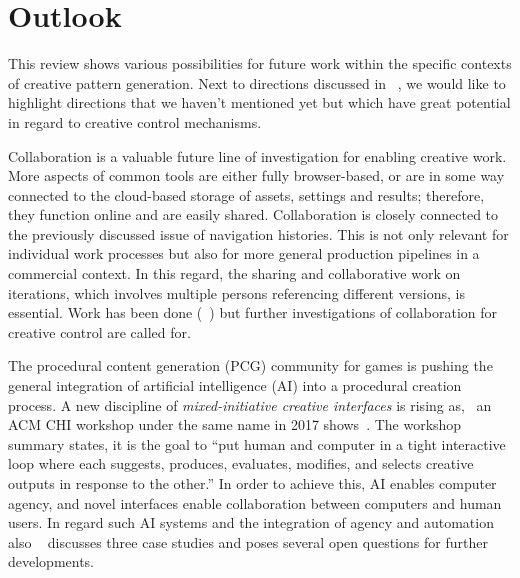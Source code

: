 
\section{Outlook}
\label{sec:outlook}

This review shows various possibilities for future work within the specific contexts of creative pattern generation. Next to directions discussed in ~, we would like to highlight directions that we haven't mentioned yet but which have great potential in regard to creative control mechanisms.

Collaboration is a valuable future line of investigation for enabling creative work. More aspects of common tools are either fully browser-based, or are in some way connected to the cloud-based storage of assets, settings and results; therefore, they function online and are easily shared. Collaboration is closely connected to the previously discussed issue of navigation histories. This is not only relevant for individual work processes but also for more general production pipelines in a commercial context. In this regard, the sharing and collaborative work on iterations, which involves multiple persons referencing different versions, is essential. Work has been done (\eg~\cite{talton_2009_emw, salvati_2015_mcm,oleary_2018_csi}) but further investigations of collaboration for creative control are called for. 

The procedural content generation (PCG) community for games is pushing the general integration of artificial intelligence (AI) into a procedural creation process. A new discipline of \textit{mixed-initiative creative interfaces} is rising as, \eg~an ACM CHI workshop under the same name in 2017 shows~\cite{deterding_2017_mci}. The workshop summary states, it is the goal to ``put human and computer in a tight interactive loop where each suggests, produces, evaluates, modifies, and selects creative outputs in response to the other.'' In order to achieve this, AI enables computer agency, and novel interfaces enable collaboration between computers and human users. In regard such AI systems and the integration of agency and automation also \citeauthor*{heer_2019_apa}~\cite{heer_2019_apa} discusses three case studies and poses several open questions for further developments.

